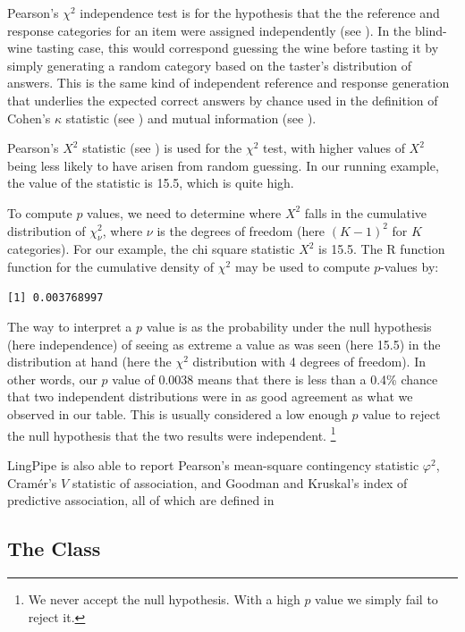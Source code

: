 Pearson's $\chi^2$ independence test is for the hypothesis that the
the reference and response categories for an item were assigned
independently (see ).  In the
blind-wine tasting case, this would correspond guessing the wine
before tasting it by simply generating a random category based on the
taster's distribution of answers.  This is the same kind of
independent reference and response generation that underlies the
expected correct answers by chance used in the definition of Cohen's
$\kappa$ statistic (see ) and mutual
information (see ).

Pearson's $X^2$ statistic (see
) is used for the $\chi^2$
test, with higher values of $X^2$ being less likely to have arisen
from random guessing.  In our running example, the value of the
statistic is 15.5, which is quite high.  

To compute $p$ values, we need to determine where $X^2$ falls in the
cumulative distribution of $\chi^2_{\nu}$, where $\nu$ is the degrees
of freedom (here $(K-1)^2$ for $K$ categories).  For our example, the
chi square statistic $X^2$ is 15.5.  The R function function
 for the cumulative density of $\chi^2$ may be used to
compute $p$-values by:
%
\begin{verbatim}
[1] 0.003768997

\end{verbatim}
%
The way to interpret a $p$ value is as the probability under the null
hypothesis (here independence) of seeing as extreme a value as was
seen (here 15.5) in the distribution at hand (here the $\chi^2$
distribution with 4 degrees of freedom).  In other words, our $p$
value of 0.0038 means that there is less than a 0.4\% chance that
two independent distributions were in as good agreement as what we
observed in our table.  This is usually considered a low enough
$p$ value to reject the null hypothesis that the two results
were independent.%
%
\footnote{We never accept the null hypothesis.  With a high $p$ value
  we simply fail to reject it.}

LingPipe is also able to report Pearson's mean-square contingency
statistic $\varphi^2$, Cramér's $V$ statistic of association, and
Goodman and Kruskal's index of predictive association, all of which
are defined in 

\subsection{The  Class}

